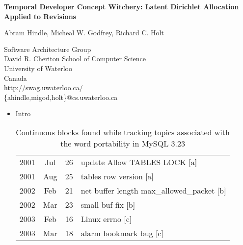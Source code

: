 \documentclass[titlepage,usenames,a4,landscape,semhelv]{seminar}
\author{
\names \\ 
{\small Software Architecture Group }\\
\small David R. Cheriton School of Computer Science\\
\small University of Waterloo\\
\small Canada\\
ahindle@cs.uwaterloo.ca
}
\newcommand{\gettitle}{Temporal Developer Concept Witchery: Latent Dirichlet Allocation Applied to Revisions}
\newcommand{\gettitleproper}{\gettitle}
\newcommand{\names}{Abram Hindle, Micheal W. Godfrey, Richard C. Holt}
\begin{document}
\pagestyle{fancy} %
\begin{slide}

\begin{center}
{\bf \LARGE \gettitleproper }

{\names } 

{\small Software Architecture Group }\\[-.5em]
{\small David R. Cheriton School of Computer Science}\\[-.5em]
{\small University of Waterloo}\\[-.5em]
{\small Canada}\\[-.5em]
{\small http://swag.uwaterloo.ca/}\\
\{ahindle,migod,holt\}@cs.uwaterloo.ca


\end{center}

\begin{itemize}
\item Intro

\newslide

\begin{table*}
\centering
\begin{tabular}{|ccc|l|}

\hline
2001 &	Jul &	26 &		update Allow TABLES LOCK [a] \\ 

2001 &	Aug &	25 &		tables row version [a] \\
\hline
\hline
2002 &	Feb &	21 &		net buffer length	max\_allowed\_packet [b] \\
2002 &	Mar &	23 &		small buf fix [b]	\\
\hline
\hline
2003 &	Feb &	16 &		Linux errno	[c] \\
2003 &	Mar &	18 &		alarm bookmark bug [c] \\
\hline
\end{tabular}
\caption{Continuous blocks found while tracking topics associated with the word portability in MySQL 3.23}
\label{tab:portability}
\end{table*}


\end{itemize}
\end{slide}
\end{document}
